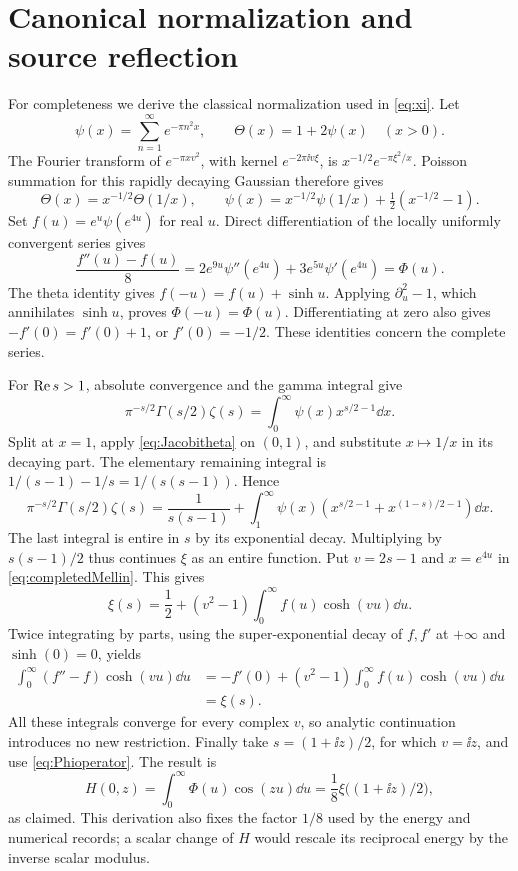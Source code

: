 \section{Canonical normalization and source reflection}\label{sec:normalization}

For completeness we derive the classical normalization used in
\eqref{eq:xi}. Let
\[
 \psi(x)=\sum_{n=1}^\infty e^{-\pi n^2x},\qquad
 \Theta(x)=1+2\psi(x)\quad(x>0).
\]
The Fourier transform of $e^{-\pi x v^2}$, with kernel
$e^{-2\pi\ii v\xi}$, is $x^{-1/2}e^{-\pi\xi^2/x}$.
Poisson summation for this rapidly decaying Gaussian therefore gives
\begin{equation}\label{eq:Jacobitheta}
 \Theta(x)=x^{-1/2}\Theta(1/x),\qquad
 \psi(x)=x^{-1/2}\psi(1/x)+\tfrac12(x^{-1/2}-1).
\end{equation}
Set $f(u)=e^u\psi(e^{4u})$ for real $u$. Direct differentiation of the
locally uniformly convergent series gives
\begin{equation}\label{eq:Phioperator}
 \frac{f''(u)-f(u)}8
 =2e^{9u}\psi''(e^{4u})+3e^{5u}\psi'(e^{4u})=\Phi(u).
\end{equation}
The theta identity gives $f(-u)=f(u)+\sinh u$. Applying
$\partial_u^2-1$, which annihilates $\sinh u$, proves
$\Phi(-u)=\Phi(u)$. Differentiating at zero also gives
$-f'(0)=f'(0)+1$, or $f'(0)=-1/2$.
These identities concern the complete series.

For $\operatorname{Re} s>1$, absolute convergence and the gamma integral give
\[
 \pi^{-s/2}\Gamma(s/2)\zeta(s)
 =\int_0^\infty\psi(x)x^{s/2-1}\dd x.
\]
Split at $x=1$, apply \eqref{eq:Jacobitheta} on $(0,1)$, and substitute
$x\mapsto1/x$ in its decaying part. The elementary remaining integral is
$1/(s-1)-1/s=1/(s(s-1))$. Hence
\begin{equation}\label{eq:completedMellin}
 \pi^{-s/2}\Gamma(s/2)\zeta(s)
 =\frac1{s(s-1)}+
 \int_1^\infty\psi(x)
 \left(x^{s/2-1}+x^{(1-s)/2-1}\right)\dd x.
\end{equation}
The last integral is entire in $s$ by its exponential decay. Multiplying
by $s(s-1)/2$ thus continues $\xi$ as an entire function. Put
$v=2s-1$ and $x=e^{4u}$ in \eqref{eq:completedMellin}. This gives
\begin{equation}\label{eq:ximellin}
 \xi(s)=\frac12+(v^2-1)\int_0^\infty f(u)\cosh(vu)\dd u.
\end{equation}
Twice integrating by parts, using the super-exponential decay of $f,f'$
at $+\infty$ and $\sinh(0)=0$, yields
\begin{align*}
 \int_0^\infty(f''-f)\cosh(vu)\dd u
 &=-f'(0)+(v^2-1)\int_0^\infty f(u)\cosh(vu)\dd u\\
 &=\xi(s).
\end{align*}
All these integrals converge for every complex $v$, so analytic
continuation introduces no new restriction. Finally take
$s=(1+\ii z)/2$, for which $v=\ii z$, and use
\eqref{eq:Phioperator}. The result is
\[
 H(0,z)=\int_0^\infty\Phi(u)\cos(zu)\dd u
       =\frac18\xi\bigl((1+\ii z)/2\bigr),
\]
as claimed. This derivation also fixes the factor $1/8$ used by the
energy and numerical records; a scalar change of $H$ would rescale its
reciprocal energy by the inverse scalar modulus.
